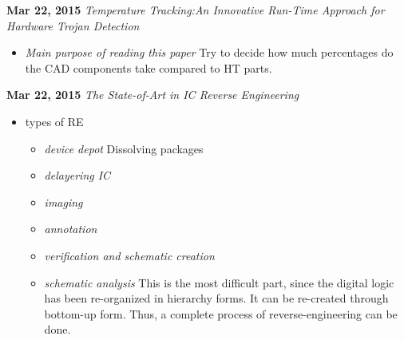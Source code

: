 \documentclass[]{article}
\begin{document}
\noindent \textbf{Mar 22, 2015}
\textit{Temperature Tracking:An Innovative Run-Time Approach for Hardware Trojan
    Detection}
\indent		\begin{itemize}
                \item \textit{Main purpose of reading this paper} Try to decide
                how much percentages do the CAD components take compared to HT
                parts.
            \end{itemize}

\noindent \textbf{Mar 22, 2015}
\textit{The State-of-Art in IC Reverse Engineering}
\indent     \begin{itemize}
                \item types of RE
                \begin{itemize}
                    \item \textit{device depot} Dissolving packages
                    \item \textit{delayering IC}
                    \item \textit{imaging}
                    \item \textit{annotation}
                    \item \textit{verification and schematic creation}
                    \item \textit{schematic analysis} This is the most difficult
                    part, since the digital logic has been re-organized in
                    hierarchy forms. It can be re-created through bottom-up
                    form. Thus, a complete process of reverse-engineering can be
                    done.
                \end{itemize} 
            \end{itemize}    
\end{document}

